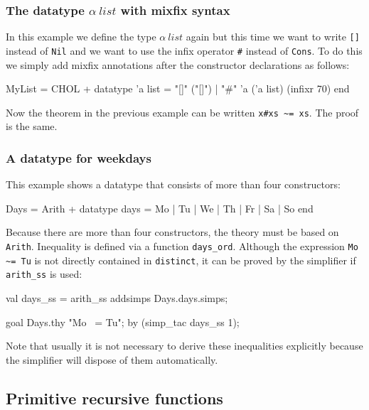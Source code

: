 \subsubsection{The datatype $\alpha~list$ with mixfix syntax}

In this example we define the type $\alpha~list$ again but this time we want
to write {\tt []} instead of {\tt Nil} and we want to use the infix operator
\verb|#| instead of {\tt Cons}. To do this we simply add mixfix annotations
after the constructor declarations as follows:
\begin{ttbox}
MyList = CHOL +
  datatype 'a list = "[]" ("[]") 
                   | "#" 'a ('a list) (infixr 70)
end
\end{ttbox}
Now the theorem in the previous example can be written \verb|x#xs ~= xs|. The
proof is the same.


\subsubsection{A datatype for weekdays}

This example shows a datatype that consists of more than four constructors:
\begin{ttbox}
Days = Arith +
  datatype days = Mo | Tu | We | Th | Fr | Sa | So
end
\end{ttbox}
Because there are more than four constructors, the theory must be based on
{\tt Arith}. Inequality is defined via a function \verb|days_ord|. Although
the expression \verb|Mo ~= Tu| is not directly contained in {\tt distinct},
it can be proved by the simplifier if \verb$arith_ss$ is used:
\begin{ttbox}
val days_ss = arith_ss addsimps Days.days.simps;

goal Days.thy "Mo ~= Tu";
by (simp_tac days_ss 1);
\end{ttbox}
Note that usually it is not necessary to derive these inequalities explicitly
because the simplifier will dispose of them automatically.

\subsection{Primitive recursive functions}

